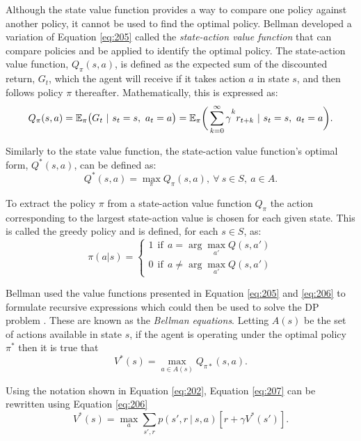 Although the state value function provides a way to compare one policy against another policy, it cannot be used to find the optimal policy. Bellman developed a variation of Equation \ref{eq:205} called the \textit{state-action value function} that can compare policies and be applied to identify the optimal policy. The state-action value function, $Q_{\pi}(s,a)$, is defined as the expected sum of the discounted return, $G_t$, which the agent will receive if it takes action $a$ in state $s$, and then follows policy $\pi$ thereafter. Mathematically, this is expressed as:
\begin{equation}
	Q_{\pi}(s, a) = \mathbb{E}_{\pi} \big( G_t \ | \ s_t = s, \ a_t = a \big) = \mathbb{E}_{\pi} \bigg( \sum_{k = 0}^{\infty} \gamma\mystrut^k r_{t+k} \ | \ s_t = s, \ a_t = a \bigg). \label{eq:206}
\end{equation}

Similarly to the state value function, the state-action value function's optimal form, $Q^*(s,a)$, can be defined as:
\begin{equation}
	Q^*(s,a) = \max_{\pi} Q_{\pi}(s,a), \ \forall \ s \in S, \ a \in A.
\end{equation}

To extract the policy $\pi$ from a state-action value function $Q_{\pi}$ the action corresponding to the largest state-action value is chosen for each given state. This is called the greedy policy and is defined, for each $s \in S$, as:
\begin{equation}
	\pi (a | s) = %
	   \begin{cases}
	   		1 \ \ \text{if} \ \ a = \arg\max_{a'} Q(s,a') \\
	   		0 \ \ \text{if} \ \ a \neq \arg\max_{a'} Q(s,a')
	   \end{cases} \label{eq:210}
\end{equation} 

Bellman used the value functions presented in Equation \ref{eq:205} and \ref{eq:206} to formulate recursive expressions which could then be used to solve the DP problem \cite{Bellm1957}. These are known as the \textit{Bellman equations}. Letting $A(s)$ be the set of actions available in state $s$, if the agent is operating under the optimal policy $\pi^*$ then it is true that
\begin{equation}
	V^*(s) = \max_{a \in A(s)} Q_{\pi*}(s,a). \label{eq:207}
\end{equation}

Using the notation shown in Equation \ref{eq:202}, Equation \ref{eq:207} can be rewritten using Equation \ref{eq:206}
\begin{equation}
	V^*(s) = \max_{a} \sum_{s',r} p(s', r \ | \ s, a)[r + \gamma V^*(s')]. \label{eq:208}
\end{equation}  

